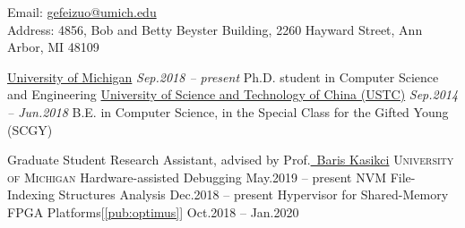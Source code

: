\documentclass[10pt,a4paper]{article}
\newcommand{\seperator}{\spacedhrule{0.5em}{-1em}}
\begin{document}
\sloppy  %



\nobreakvspace{0.3em}  %

\noindent Email: \href{mailto:gefeizuo@umich.edu}{\mbox{gefeizuo@umich.edu}}
\\
Address: 4856, Bob and Betty Beyster Building, 2260 Hayward Street, Ann Arbor, MI 48109

\seperator  %

\headedsection
{\href{https://umich.edu}{University of Michigan}}
{\textit{Sep.2018 -- present}}
{
	\headedsubsection
	{Ph.D. student in Computer Science and Engineering}
	{}
	{}
}
\headedsection  %
{\href{http://ustc.edu.cn/}{University of Science and Technology of China (USTC)}}
{\textit{Sep.2014 -- Jun.2018}} {
	\headedsubsection
	{B.E. in Computer Science, in the Special Class for the Gifted Young (SCGY)}
	{}
	{}
}

\seperator


\headedsection
{Graduate Student Research Assistant, advised by Prof.\href{https://web.eecs.umich.edu/~barisk/}{\ Baris Kasikci}}
{\textsc{University of Michigan}}
{
	\headedsubsection
	{Hardware-assisted Debugging}
	{May.2019 -- present}
	{}
	\headedsubsection
	{NVM File-Indexing Structures Analysis}
	{Dec.2018 -- present}
	{}
	\headedsubsection
	{Hypervisor for Shared-Memory FPGA Platforms[\ref{pub:optimus}]}
	{Oct.2018 -- Jan.2020}
	{}
}
\end{document}
